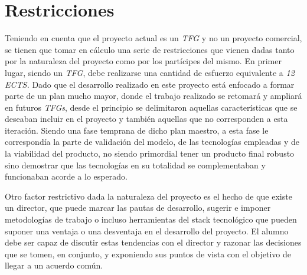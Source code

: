 \section{Restricciones} \label{phytoscheme.restricciones}
\par
Teniendo en cuenta que el proyecto actual es un \textit{TFG} y no un proyecto comercial, se tienen que tomar en cálculo una serie de restricciones que vienen dadas tanto por la naturaleza del proyecto como por los partícipes del mismo. En primer lugar, siendo un \textit{TFG}, debe realizarse una cantidad de esfuerzo equivalente a \textit{12 ECTS.} Dado que el desarrollo realizado en este proyecto está enfocado a formar parte de un plan mucho mayor, donde el trabajo realizado se retomará y ampliará en futuros \textit{TFGs}, desde el principio se delimitaron aquellas características que se deseaban incluir en el proyecto y también aquellas que no corresponden a esta iteración.  Siendo una fase temprana de dicho plan maestro, a esta fase le correspondía la parte de validación del modelo, de las tecnologías empleadas y de la viabilidad del producto, no siendo primordial tener un producto final robusto sino demostrar que las tecnologías en su totalidad se complementaban y funcionaban acorde a lo esperado. 
\par
Otro factor restrictivo dada la naturaleza del proyecto es el hecho de que existe un director, que puede marcar las pautas de desarrollo, sugerir e imponer metodologías de trabajo o incluso herramientas del stack tecnológico que pueden suponer una ventaja o una desventaja en el desarrollo del proyecto. El alumno debe ser capaz de discutir estas tendencias con el director y razonar las decisiones que se tomen, en conjunto, y exponiendo sus puntos de vista con el objetivo de llegar a un acuerdo común. 





